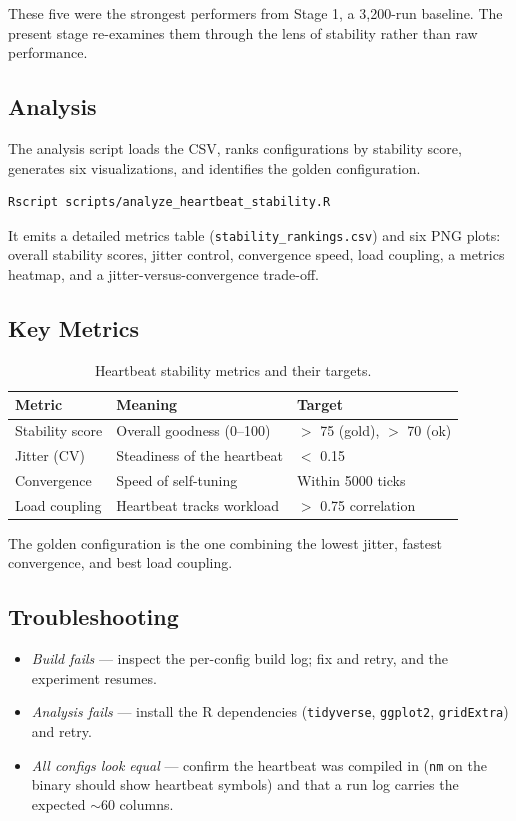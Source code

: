 These five were the strongest performers from Stage 1, a 3{,}200-run baseline.
The present stage re-examines them through the lens of stability rather than raw
performance.

\subsection{Analysis}

The analysis script loads the CSV, ranks configurations by stability score,
generates six visualizations, and identifies the golden configuration.

\begin{lstlisting}[language=bash]
Rscript scripts/analyze_heartbeat_stability.R
\end{lstlisting}

It emits a detailed metrics table (\texttt{stability\_rankings.csv}) and six
PNG plots: overall stability scores, jitter control, convergence speed, load
coupling, a metrics heatmap, and a jitter-versus-convergence trade-off.

\subsection{Key Metrics}

\begin{table}[h]
\centering
\begin{tabular}{lll}
\toprule
Metric & Meaning & Target \\
\midrule
Stability score & Overall goodness (0--100) & $>$ 75 (gold), $>$ 70 (ok) \\
Jitter (CV) & Steadiness of the heartbeat & $<$ 0.15 \\
Convergence & Speed of self-tuning & Within 5000 ticks \\
Load coupling & Heartbeat tracks workload & $>$ 0.75 correlation \\
\bottomrule
\end{tabular}
\caption{Heartbeat stability metrics and their targets.}
\end{table}

The golden configuration is the one combining the lowest jitter, fastest
convergence, and best load coupling.

\subsection{Troubleshooting}

\begin{itemize}
  \item \emph{Build fails} --- inspect the per-config build log; fix and retry,
    and the experiment resumes.
  \item \emph{Analysis fails} --- install the R dependencies (\texttt{tidyverse},
    \texttt{ggplot2}, \texttt{gridExtra}) and retry.
  \item \emph{All configs look equal} --- confirm the heartbeat was compiled in
    (\texttt{nm} on the binary should show heartbeat symbols) and that a run log
    carries the expected $\sim$60 columns.
\end{itemize}

